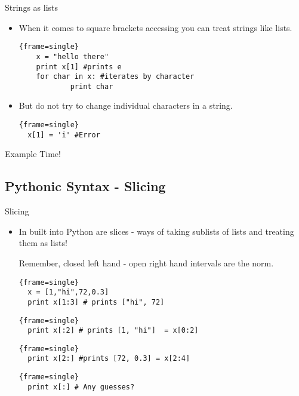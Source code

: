 \documentclass{beamer}
\begin{document}
\begin{frame}[fragile]{Strings as lists}
  \begin{itemize}
  \item {
  When it comes to square brackets accessing you can treat strings like lists.
  \begin{block}{}
  \begin{lstlisting}{frame=single}
    x = "hello there"
    print x[1] #prints e
    for char in x: #iterates by character
            print char 
  \end{lstlisting}
\end{block}
  }
  \pause
  \item {
  But do not try to change individual characters in a string.
  \begin{block}{}
\begin{lstlisting}{frame=single}
  x[1] = 'i' #Error
  \end{lstlisting}
\end{block}
  }
  \end{itemize}
\end{frame}

\begin{frame}
	Example Time!
\end{frame}

\subsection{Pythonic Syntax - Slicing}
\begin{frame}[fragile]{Slicing}
  \begin{itemize}
  \item {
  In built into Python are slices - ways of taking sublists of lists and treating them as lists!
  
  Remember, closed left hand - open right hand intervals are the norm.
  \begin{block}{}
  \begin{lstlisting}{frame=single}
  x = [1,"hi",72,0.3]
  print x[1:3] # prints ["hi", 72]
  \end{lstlisting}
\end{block}
  \pause
  \begin{block}{}
  \begin{lstlisting}{frame=single}
  print x[:2] # prints [1, "hi"]  = x[0:2]
  \end{lstlisting}
\end{block}
  \pause
  \begin{block}{}
  \begin{lstlisting}{frame=single}
  print x[2:] #prints [72, 0.3] = x[2:4]
  \end{lstlisting}
\end{block}
  \pause
  \begin{lstlisting}{frame=single}
  print x[:] # Any guesses?
  \end{lstlisting}
  }
  \end{itemize}
  

\end{frame}
\end{document}
